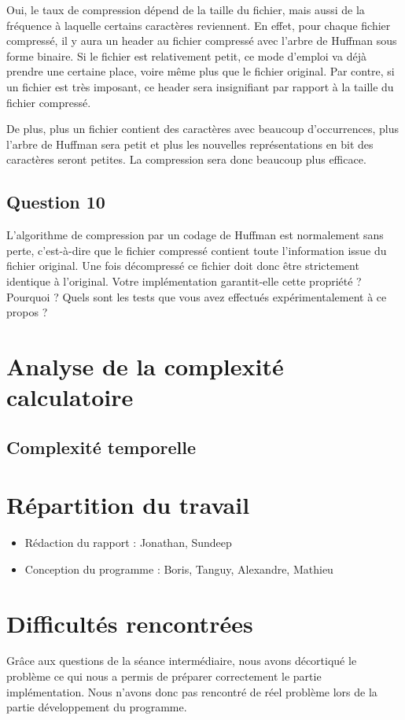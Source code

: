 \documentclass[11pt]{article}
\begin{document}
Oui, le taux de compression dépend de la taille du fichier, mais aussi de la fréquence à laquelle certains caractères	reviennent. En effet, pour chaque fichier compressé, il y aura un header au fichier compressé avec l'arbre de Huffman sous forme binaire. Si le fichier est relativement petit, ce mode d'emploi va déjà prendre une certaine place, voire même plus que le fichier original. Par contre, si un fichier est très imposant, ce header sera insignifiant par rapport à la taille du fichier compressé.

De plus, plus un fichier contient des caractères avec beaucoup d'occurrences, plus l'arbre de Huffman sera petit et plus les nouvelles représentations en bit des caractères seront petites. La compression sera donc beaucoup plus efficace.

\subsection*{Question 10}
L'algorithme de compression par un codage de Huffman est normalement sans perte, c'est-à-dire que le fichier compressé contient toute l'information issue du fichier original. Une fois décompressé ce fichier doit donc être strictement identique à l'original. Votre implémentation garantit-elle cette propriété ? Pourquoi ? Quels sont les tests que vous avez effectués expérimentalement à ce propos ? \\

\section{Analyse de la complexité calculatoire}
\subsection{Complexité temporelle}

\section{Répartition du travail}

\begin{itemize}
\item Rédaction du rapport : Jonathan, Sundeep
\item Conception du programme : Boris, Tanguy, Alexandre, Mathieu
\end{itemize}

\section{Difficultés rencontrées}
Grâce aux questions de la séance intermédiaire, nous avons décortiqué le problème ce qui nous a permis de préparer correctement le partie implémentation. Nous n'avons donc pas rencontré de réel problème lors de la partie développement du programme.
\end{document}
